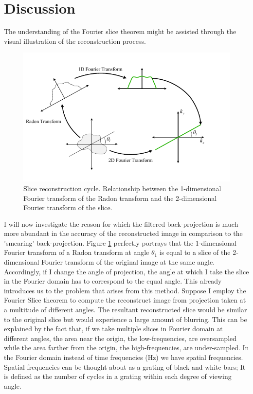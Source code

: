 \documentclass[12pt]{article}
\begin{document}
\section{Discussion}
The understanding of the Fourier slice theorem might be assisted through the visual illustration of the reconstruction process. 
\begin{figure}[hbt]
	\includegraphics[width = .7\textwidth]{discussion/reconstruction_cycle}
	\caption{Slice reconstruction cycle. Relationship between the 1-dimensional Fourier transform of the Radon transform and the 2-dimensional Fourier transform of the slice.}\label{fig.recon}
\end{figure}
I will now investigate the reason for which the filtered back-projection is much more abundant in the accuracy of the reconstructed image in comparison to the 'smearing' back-projection.
Figure \ref{fig.recon} perfectly portrays that the 1-dimensional Fourier transform of a Radon transform at angle $\theta_1$ is equal to a slice of the 2-dimensional Fourier transform of the original image at the same angle. Accordingly, if I change the angle of projection, the angle at which I take the slice in the Fourier domain has to correspond to the equal angle. This already introduces us to the problem that arises from this method. Suppose I employ the Fourier Slice theorem to compute the reconstruct image from projection taken at a multitude of different angles. The resultant reconstructed slice would be similar to the original slice but would experience a large amount of blurring. This can be explained by the fact that, if we take multiple slices in Fourier domain at different angles, the area near the origin, the low-frequencies, are oversampled while the area farther from the origin, the high-frequencies, are under-sampled. In the Fourier domain instead of time frequencies (Hz) we have spatial frequencies. Spatial frequencies can be thought about as a grating of black and white bars; It is defined as the number of cycles in a grating within each degree of viewing angle.
\end{document}
